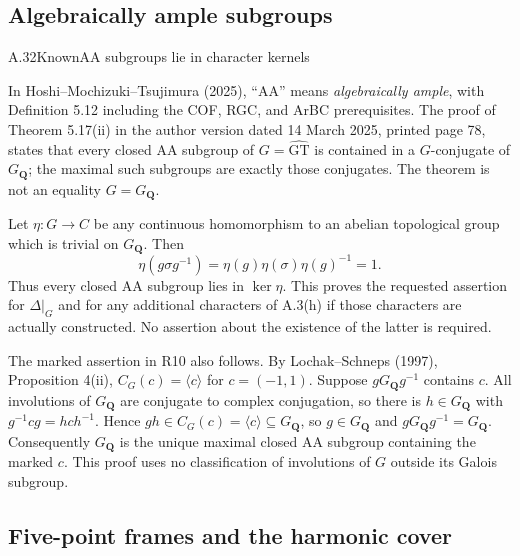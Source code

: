 \subsection{Algebraically ample subgroups}


\begin{statement}{A.32}{Known}{AA subgroups lie in character kernels}
\citep[Definition 5.12 and Theorem 5.17(ii)]{LitHoshiMochizukiTsujimura2025}
\end{statement}
In Hoshi--Mochizuki--Tsujimura (2025), ``AA'' means
\emph{algebraically ample}, with Definition 5.12 including the
COF, RGC, and ArBC prerequisites.  The proof of Theorem 5.17(ii)
in the author version dated 14 March 2025, printed page 78,
states that every closed AA subgroup of
$G=\widehat{\mathrm{GT}}$ is contained in a $G$-conjugate of
$G_{\mathbf Q}$; the maximal such subgroups are exactly those
conjugates.  The theorem is not an equality $G=G_{\mathbf Q}$.

Let $\eta:G\to C$ be any continuous homomorphism to an abelian
topological group which is trivial on $G_{\mathbf Q}$.  Then
\[
 \eta(g\sigma g^{-1})
 =\eta(g)\eta(\sigma)\eta(g)^{-1}=1.
\]
Thus every closed AA subgroup lies in $\ker\eta$.  This proves
the requested assertion for $\Delta|_G$ and for any additional
characters of A.3(h) if those characters are actually constructed.
No assertion about the existence of the latter is required.

The marked assertion in R10 also follows.  By
Lochak--Schneps (1997), Proposition 4(ii),
$C_G(c)=\langle c\rangle$ for $c=(-1,1)$.
Suppose $gG_{\mathbf Q}g^{-1}$ contains $c$.  All involutions of
$G_{\mathbf Q}$ are conjugate to complex conjugation, so there
is $h\in G_{\mathbf Q}$ with
$g^{-1}cg=hch^{-1}$.  Hence $gh\in C_G(c)=\langle c\rangle
\subseteq G_{\mathbf Q}$, so $g\in G_{\mathbf Q}$ and
$gG_{\mathbf Q}g^{-1}=G_{\mathbf Q}$.  Consequently
$G_{\mathbf Q}$ is the unique maximal closed AA subgroup
containing the marked $c$.  This proof uses no classification of
involutions of $G$ outside its Galois subgroup.

\subsection{Five-point frames and the harmonic cover}


